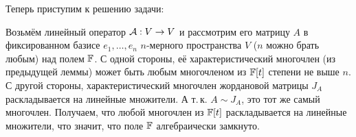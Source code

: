 Теперь приступим к решению задачи:

\begin{solution}
    Возьмём линейный оператор $\mathcal{A}: V \to V$ и рассмотрим его матрицу $A$ в фиксированном базисе $e_1, \ldots, e_n$ $n$-мерного пространства $V$ ($n$ можно брать любым) над полем $\mathbb{F}$. С одной стороны, её характеристический многочлен (из предыдущей леммы) может быть любым многочленом из $\mathbb{F}[t]$ степени не выше $n$. С другой стороны, характеристический многочлен жордановой матрицы $J_A$ раскладывается на линейные множители. А т.\,к. $A \sim J_A$, это тот же самый многочлен. Получаем, что любой многочлен из $\mathbb{F}[t]$ раскладывается на линейные множители, что значит, что поле $\mathbb{F}$ алгебраически замкнуто.
\end{solution}

